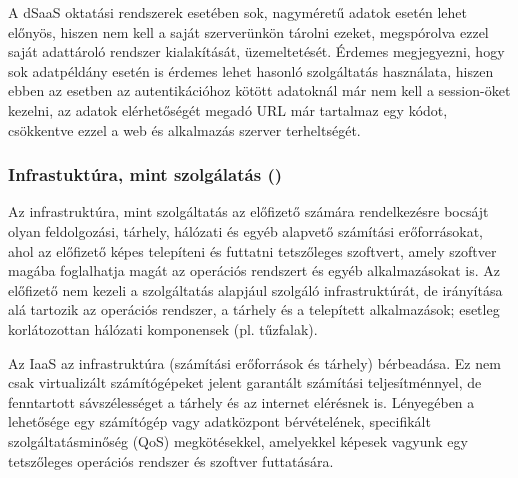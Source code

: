 A dSaaS oktatási rendszerek esetében sok, nagyméretű adatok esetén lehet előnyös, hiszen nem kell a saját szerverünkön tárolni ezeket, megspórolva ezzel saját adattároló rendszer kialakítását, üzemeltetését. Érdemes megjegyezni, hogy sok adatpéldány esetén is érdemes lehet hasonló szolgáltatás használata, hiszen ebben az esetben az autentikációhoz kötött adatoknál már nem kell a session-öket kezelni, az adatok elérhetőségét megadó URL már tartalmaz egy kódot, csökkentve ezzel a web és alkalmazás szerver terheltségét. 


\subsubsection{Infrastuktúra, mint szolgálatás ()}

Az infrastruktúra, mint szolgáltatás az előfizető számára rendelkezésre bocsájt olyan feldolgozási, tárhely, hálózati és egyéb alapvető számítási erőforrásokat, ahol az előfizető képes telepíteni és futtatni tetszőleges szoftvert, amely szoftver magába foglalhatja magát az operációs rendszert és egyéb alkalmazásokat is. Az előfizető nem kezeli a szolgáltatás alapjául szolgáló infrastruktúrát, de irányítása alá tartozik az operációs rendszer, a tárhely és a telepített alkalmazások; esetleg korlátozottan hálózati komponensek (pl. tűzfalak).\cite{nistsp800-145}

Az IaaS az infrastruktúra (számítási erőforrások és tárhely) bérbeadása. Ez nem csak virtualizált számítógépeket jelent garantált számítási teljesítménnyel, de fenntartott sávszélességet a tárhely és az internet elérésnek is. Lényegében a lehetősége egy számítógép vagy adatközpont bérvételének, specifikált szolgáltatásminőség (QoS) megkötésekkel, amelyekkel képesek vagyunk egy tetszőleges operációs rendszer és szoftver futtatására.\cite{ccwlinux}


